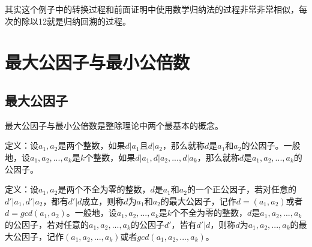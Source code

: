 \documentclass[12pt, a4paper, oneside]{ctexart}
\begin{document}
其实这个例子中的转换过程和前面证明中使用数学归纳法的过程非常非常相似，每次的除以12就是归纳回溯的过程。
\section*{最大公因子与最小公倍数}
\subsection*{最大公因子}
最大公因子与最小公倍数是整除理论中两个最基本的概念。

定义：设$a_1,a_2$是两个整数，如果$d|a_1$且$d|a_2$，那么就称$d$是$a_1$和$a_2$的公因子。一般地，设$a_1,a_2,...,a_k$是$k$个整数，如果$d|a_1,d|a_2,...,d|a_k$，那么就称$d$是$a_1,a_2,...,a_k$的公因子。

定义：设$a_1,a_2$是两个不全为零的整数，$d$是$a_1$和$a_2$的一个正公因子，若对任意的$d'|a_1,d'|a_2$，都有$d'|d$成立，则称$d$为$a_1$和$a_2$的最大公因子，记作$d=(a_1,a_2)$或者$d=gcd(a_1,a_2)$。一般地，设$a_1,a_2,...,a_k$是$k$个不全为零的整数，$d$是$a_1,a_2,...,a_k$的公因子，若对任意的$a_1,a_2,...,a_k$的公因子$d'$，皆有$d'|d$，则称$d$为$a_1,a_2,...,a_k$的最大公因子，记作$(a_1,a_2,...,a_k)$或者$gcd(a_1,a_2,...,a_k)$。
\end{document}
